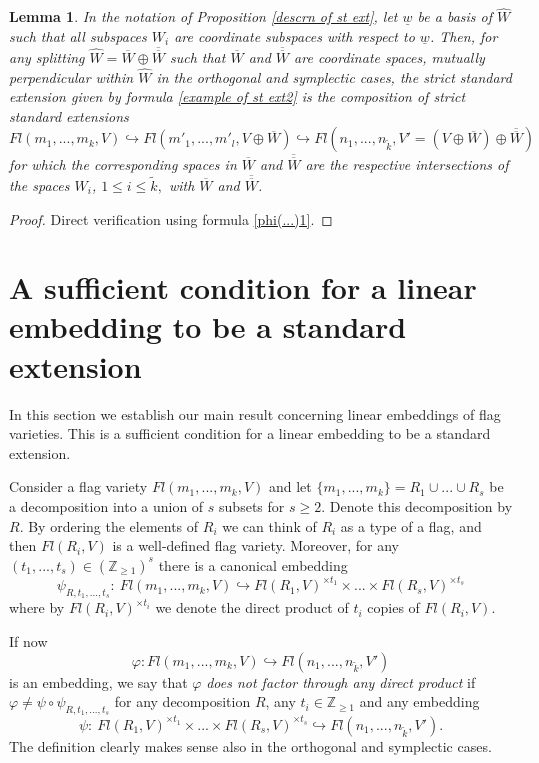 \documentclass[12pt]{amsart}
\renewcommand{\phi}{\varphi}
\newtheorem{lemma}[theorem]{Lemma}
\theoremstyle{definition}
\begin{document}
\begin{lemma}\label{Lemma 3.7}
In the notation of Proposition \ref{descrn of st ext}, let 
$\underline{w}$ be a basis of $\widehat{W}$ such that all 
subspaces $W_i$ are coordinate subspaces with respect to 
$\underline{w}$. Then, for any splitting $\widehat{W}=
\overline{W}\oplus\overline{\overline{W}}$ such that 
$\overline{W}$ and $\overline{\overline{W}}$ are
coordinate spaces, mutually perpendicular within $\widehat{W}$
in the orthogonal and symplectic cases, the strict standard 
extension given by formula \eqref{example of st ext2} is the 
composition of strict standard extensions
$$
Fl(m_1,...,m_k,V)\hookrightarrow Fl(m'_1,...,m'_l,V\oplus
\overline{W})\hookrightarrow Fl(n_1,...,n_{\tilde{k}},V'=
(V\oplus\overline{W})\oplus\overline{\overline{W}})
$$
for which the corresponding spaces in $\overline{W}$ and 
$\overline{\overline{W}}$ are the respective intersections of 
the spaces $W_i$, $1\le i\le\tilde{k},$ with 
$\overline{W}$ and $\overline{\overline{W}}$.
\end{lemma}
\begin{proof}
Direct verification  using formula \eqref{phi(...)1}.
\end{proof}


\vspace{1cm}
\section{A sufficient condition for a linear embedding to be a 
standard extension}\label{more linear embed}
\vspace{5mm}

In this section we establish our main result concerning linear 
embeddings of flag varieties. This is a sufficient condition 
for a linear embedding to be a standard extension.

Consider a flag variety $Fl(m_1,...,m_k,V)$ and let $\{m_1,
...,m_k\}=R_1\cup...\cup R_s$ be a decomposition into a union 
of $s$ subsets for $s\ge2$. Denote this decomposition 
by $R$. By ordering 
the elements of $R_i$ we can think of $R_i$ as a type of a 
flag, and then $Fl(R_i,V)$ is a well-defined flag variety. 
Moreover, for any $(t_1,...,t_s)\in(\mathbb{Z}_{\ge1})^s$ there is a 
canonical embedding 
$$
\psi_{R,t_1,...,t_s}:\ Fl(m_1,...,m_k,V)\hookrightarrow
Fl(R_1,V)^{\times t_1}\times...\times Fl(R_s,V)^{\times t_s}
$$
where by $Fl(R_i,V)^{\times t_i}$ we denote the direct product of 
$t_i$ copies of $Fl(R_i,V)$.

If now 
$$\phi: Fl(m_1,...,m_k,V)\hookrightarrow Fl(n_1,...,n_{\tilde{k}},V')$$
is an embedding, we say that $\phi$ 
\textit{does not factor through any direct product} if $\phi\ne
\psi\circ\psi_{R,t_1,...,t_s}$ for any decomposition $R$, any
$t_i\in\mathbb{Z}_{\ge1}$ and any embedding 
$$\psi:\ Fl(R_1,V)^{\times t_1}\times...\times Fl(R_s,V)^{
\times t_s}\hookrightarrow Fl(n_1,...,n_{\tilde{k}},V').$$
The definition clearly makes sense also in the orthogonal and
symplectic cases. 
\end{document}
